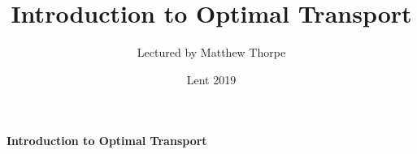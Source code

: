 \documentclass[12pt,a4paper]{article}
\newcommand{\latinmodern}[1]{{\fontfamily{lmss}\selectfont
\textbf{#1}
}}
\DeclarePairedDelimiter\bignorm{\lVert}{\rVert}
\newcommand{\doublerule}[1][.4pt]{%
  \noindent
  \makebox[0pt][l]{\rule[.7ex]{\linewidth}{#1}}%
  \rule[.3ex]{\linewidth}{#1}}
\begin{document}
\title{Introduction to Optimal Transport}
\author{Lectured by Matthew Thorpe}
\date{Lent 2019}

\maketitle

\newcommand{\statement}[1]{\latinmodern{\textbf{#1)}}}

\newcommand{\thm}{\statement{Theorem}}
\newcommand{\thmnum}[1]{\statement{Theorem #1}}
\newcommand{\defi}{\statement{Definition}}
\newcommand{\definum}[1]{\statement{Definition #1}}
\newcommand{\lem}{\statement{Lemma}}
\newcommand{\lemnum}[1]{\statement{Lemma #1}}
\newcommand{\prop}{\statement{Proposition}}
\newcommand{\propnum}[1]{\statement{Proposition #1}}
\newcommand{\corr}{\statement{Corollary}}
\newcommand{\corrnum}[1]{\statement{Corollary #1}}
\newcommand{\pf}{\textbf{proof) }}

\newcommand{\norms}[2]{\bignorm[\big]{#1}_{#2}}
\newcommand{\snorms}[2]{\bignorm[\small]{#1}_{#2}}
\newcommand{\charac}{\bm{1}}
\newcommand{\wa}[1]{ d_{ \mathrel{\scalebox{0.5}[0.5]{$W$}}^{#1}}}

\newcommand{\lap}{\triangle} %
\newcommand{\s}{\vspace{10pt}}
\newcommand{\bull}{$\bullet$}
\newcommand{\sta}{$\star$}
\newcommand{\reals}{\mathbb{R}}

\newcommand{\eop}{\hfill  \textsl{(End of proof)} $\square$} %
\newcommand{\eos}{\hfill  \textsl{(End of statement)} $\square$} %

\newcommand{\call}[1]{\quad \cdots\cdots\cdots\,\,(#1)}

\newcommand{\intN}{\mathbb{Z}_N}
\newcommand{\nat}{\mathbb{N}}
\newcommand{\abs}[1]{\big| #1 \big|}
\newcommand{\avg}{\mathbb{E}}
\newcommand{\prob}{\mathbb{P}}
\newcommand{\borel}{\mathscr{B}}
\newcommand{\EE}{\mathscr{E}}
\newcommand{\pa}{\partial}
\newcommand{\PP}{\mathscr{P}}

\renewcommand{\vec}{\underline}
\renewcommand{\bar}{\overline}

\def\doubleunderline#1{\underline{\underline{#1}}}

\newcommand{\newday}{\doublerule[0.5pt]}
\newcommand{\digression}{**********************************************************************************************}

\setlength\parindent{0pt}

\textbf{Introduction to Optimal Transport}
\end{document}
